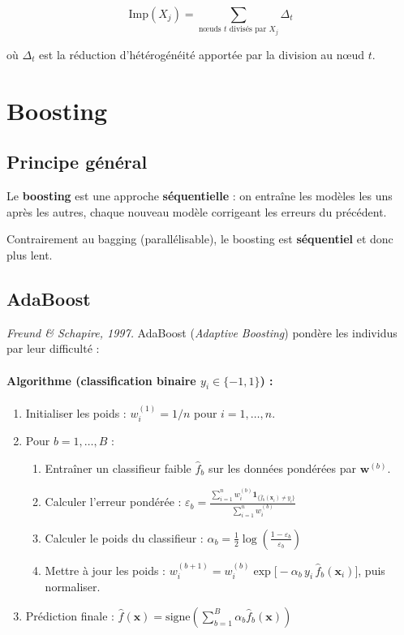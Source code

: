 \documentclass[a4paper,11pt]{article}
\begin{document}
\[
\text{Imp}(X_j) = \sum_{\text{nœuds } t \text{ divisés par } X_j} \Delta_t
\]

où $\Delta_t$ est la réduction d'hétérogénéité apportée par la division au nœud $t$.

\newpage

\section{Boosting}

\subsection{Principe général}

Le \textbf{boosting} est une approche \textbf{séquentielle} : on entraîne les modèles les uns après les autres, chaque nouveau modèle corrigeant les erreurs du précédent.

Contrairement au bagging (parallélisable), le boosting est \textbf{séquentiel} et donc plus lent.

\subsection{AdaBoost}

\textit{Freund \& Schapire, 1997.} AdaBoost (\textit{Adaptive Boosting}) pondère les individus par leur difficulté :

\paragraph{Algorithme (classification binaire $y_i \in \{-1, 1\}$) :}
\begin{enumerate}
    \item Initialiser les poids : $w_i^{(1)} = 1/n$ pour $i = 1, \ldots, n$.
    \item Pour $b = 1, \ldots, B$ :
    \begin{enumerate}
        \item Entraîner un classifieur faible $\hat{f}_b$ sur les données pondérées par $\mathbf{w}^{(b)}$.
        \item Calculer l'erreur pondérée : $\displaystyle \varepsilon_b = \frac{\sum_{i=1}^n w_i^{(b)} \mathbf{1}_{\{\hat{f}_b(\mathbf{x}_i) \neq y_i\}}}{\sum_{i=1}^n w_i^{(b)}}$
        \item Calculer le poids du classifieur : $\displaystyle \alpha_b = \frac{1}{2}\log\!\left(\frac{1-\varepsilon_b}{\varepsilon_b}\right)$
        \item Mettre à jour les poids : $w_i^{(b+1)} = w_i^{(b)} \exp\!\big[-\alpha_b \, y_i \, \hat{f}_b(\mathbf{x}_i)\big]$, puis normaliser.
    \end{enumerate}
    \item Prédiction finale : $\displaystyle \hat{f}(\mathbf{x}) = \text{signe}\!\left(\sum_{b=1}^B \alpha_b \hat{f}_b(\mathbf{x})\right)$
\end{enumerate}
\end{document}
